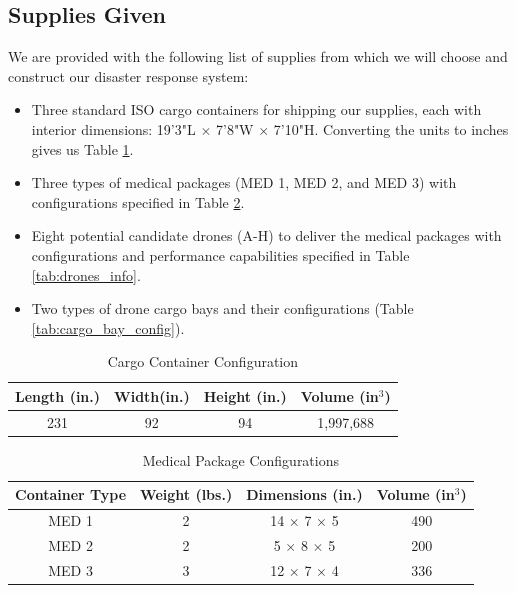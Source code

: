 \subsection{Supplies Given}
We are provided with the following list of supplies from which we will choose and construct our disaster response system:
\begin{itemize}
    \item Three standard ISO cargo containers for shipping our supplies, each with interior dimensions: 19'3"L $\times$ 7'8"W $\times$ 7'10"H. Converting the units to inches gives us Table \ref{tab:cargo_container_config}.
    \item Three types of medical packages (MED 1, MED 2, and MED 3) with configurations specified in Table \ref{tab:med_config}.
    \item Eight potential candidate drones (A-H) to deliver the medical packages with configurations and performance capabilities specified in Table \ref{tab:drones_info}.
    \item Two types of drone cargo bays and their configurations (Table \ref{tab:cargo_bay_config}).
\end{itemize}

\begin{table}[h]
    \centering
    \begin{tabular}{c|c|c|c}
    \hline Length (in.) & Width(in.) & Height (in.) & Volume (in$^3$)\\
    \hline 231 & 92 & 94 & 1,997,688
    \end{tabular}
    \caption{Cargo Container Configuration}
    \label{tab:cargo_container_config}
\end{table}

\begin{table}[h]
    \centering
    \begin{tabular}{c|c|c|c}
    \hline Container Type & Weight (lbs.) & Dimensions (in.) & Volume (in$^3$)\\
    \hline MED 1 & 2 & 14 $\times$ 7 $\times$ 5 & 490  \\
    MED 2 & 2 & 5 $\times$ 8 $\times$ 5 & 200 \\
    MED 3 & 3 & 12 $\times$ 7 $\times$ 4 & 336
    \end{tabular}
    \caption{Medical Package Configurations}
    \label{tab:med_config}
\end{table}

